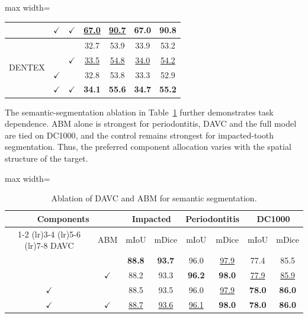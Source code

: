 \documentclass[conference]{IEEEtran}
\newcommand{\DAVC}{\textsc{DAVC}}
\newcommand{\ABM}{\textsc{ABM}}
\newcommand{\cmark}{\ensuremath{\checkmark}}
\newcommand{\mIoU}{\ensuremath{\mathrm{mIoU}}}
\newcommand{\mDice}{\ensuremath{\mathrm{mDice}}}
\newcommand{\dataset}[1]{\textsc{#1}}
\newcommand{\best}[1]{\textbf{#1}}
\newcommand{\second}[1]{\underline{#1}}
\begin{document}
\begin{table}[!t]
\begin{adjustbox}{max width=\columnwidth}
\begin{tabular}{lcc*{4}{c}}
    & \cmark & \cmark & \second{67.0} & \second{90.7} & \best{67.0} & 90.8 \\
    \midrule
    \multirow{4}{*}{DENTEX}
    &  &  & 32.7 & 53.9 & 33.9 & 53.2 \\
    &  & \cmark & \second{33.5} & \second{54.8} & \second{34.0} & \second{54.2} \\
    & \cmark &  & 32.8 & 53.8 & 33.3 & 52.9 \\
    & \cmark & \cmark & \best{34.1} & \best{55.6} & \best{34.7} & \best{55.2} \\
    \bottomrule
  \end{tabular}
  \end{adjustbox}
\end{table}

The semantic-segmentation ablation in Table~\ref{tab:segmentation-ablation} further demonstrates task dependence. \ABM{} alone is strongest for periodontitis, \DAVC{} and the full model are tied on \dataset{DC1000}, and the control remains strongest for impacted-tooth segmentation. Thus, the preferred component allocation varies with the spatial structure of the target.

\begin{table}[t]
  \centering
  \scriptsize
  \setlength{\tabcolsep}{3.0pt}
  \caption{Ablation of \DAVC{} and \ABM{} for semantic segmentation.}
  \label{tab:segmentation-ablation}
  \begin{adjustbox}{max width=\columnwidth}
  \begin{tabular}{cc*{6}{c}}
    \toprule
    \multicolumn{2}{c}{\textbf{Components}}
    & \multicolumn{2}{c}{Impacted}
    & \multicolumn{2}{c}{Periodontitis}
    & \multicolumn{2}{c}{DC1000} \\
    \cmidrule(lr){1-2}
    \cmidrule(lr){3-4}
    \cmidrule(lr){5-6}
    \cmidrule(lr){7-8}
    \DAVC{} & \ABM{} & \mIoU & \mDice & \mIoU & \mDice & \mIoU & \mDice \\
    \midrule
     &  & \best{88.8} & \best{93.7} & 96.0 & \second{97.9} & 77.4 & 85.5 \\
     & \cmark & 88.2 & 93.3 & \best{96.2} & \best{98.0} & \second{77.9} & \second{85.9} \\
    \cmark &  & 88.5 & 93.5 & 96.0 & \second{97.9} & \best{78.0} & \best{86.0} \\
    \cmark & \cmark & \second{88.7} & \second{93.6} & \second{96.1} & \best{98.0} & \best{78.0} & \best{86.0} \\
    \bottomrule
  \end{tabular}
  \end{adjustbox}
\end{table}
\end{document}
